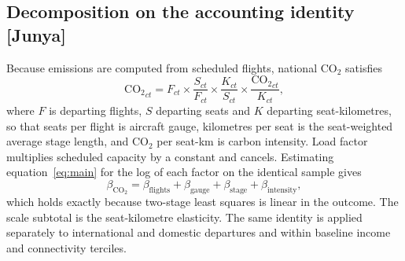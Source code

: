 \documentclass[12pt]{extarticle}
\begin{document}
\subsection*{Decomposition on the accounting identity [Junya]}
Because emissions are computed from scheduled flights, national CO$_2$
satisfies
\begin{equation}
\mathrm{CO_2}_{ct} = F_{ct} \times \frac{S_{ct}}{F_{ct}} \times
\frac{K_{ct}}{S_{ct}} \times \frac{\mathrm{CO_2}_{ct}}{K_{ct}},
\label{eq:identity}
\end{equation}
where $F$ is departing flights, $S$ departing seats and $K$ departing
seat-kilometres, so that seats per flight is aircraft gauge, kilometres per
seat is the seat-weighted average stage length, and CO$_2$ per seat-km is
carbon intensity. Load factor multiplies scheduled capacity by a constant
and cancels. Estimating equation~\ref{eq:main} for the log of each factor
on the identical sample gives
\begin{equation}
\beta_{\mathrm{CO_2}} = \beta_{\mathrm{flights}} + \beta_{\mathrm{gauge}} +
\beta_{\mathrm{stage}} + \beta_{\mathrm{intensity}},
\label{eq:decomp}
\end{equation}
which holds exactly because two-stage least squares is linear in the
outcome. The scale subtotal is the seat-kilometre elasticity. The same
identity is applied separately to international and domestic departures
and within baseline income and connectivity terciles.
\end{document}
